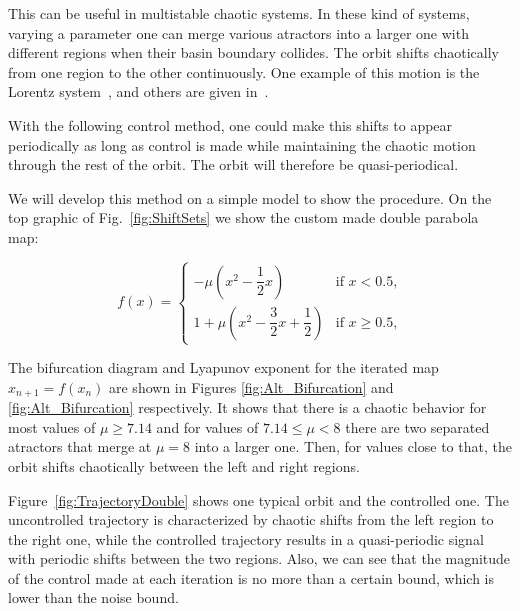 This can be useful in multistable chaotic systems. In these kind of systems, varying a parameter one can merge various atractors into a larger one with different regions when their basin boundary collides. The orbit shifts chaotically from one region to the other continuously. One example of this motion is the Lorentz system~\cite{Lorentz}, and others are given in~\cite{Multistable1,Multistable2, Multistable3, Multistable4}.

With the following control method, one could make this shifts to appear periodically as long as control is made while maintaining the chaotic motion through the rest of the orbit. The orbit will therefore be quasi-periodical.

We will develop this method on a simple model to show the procedure. On the top graphic of Fig.~\ref{fig:ShiftSets} we show the custom made double parabola map:

\begin{equation}
f(x) = \left\{ \begin{array}{ll}
-\mu (x^2 - \dfrac{1}{2}x)  & \mbox{if $x<0.5$,} \\
1 + \mu (x^2 -\dfrac{3}{2}x + \dfrac{1}{2})  & \mbox{if $x\geq 0.5$,} 
\end{array}
\right.
\end{equation}


The bifurcation diagram and Lyapunov exponent for the iterated map $x_{n+1} = f(x_n)$ are shown in Figures \ref{fig:Alt_Bifurcation} and \ref{fig:Alt_Bifurcation} respectively. It shows that there is a chaotic behavior for most values of $\mu \geq 7.14$ and for values of $ 7.14 \leq \mu < 8$ there are two separated atractors that merge at $\mu = 8$ into a larger one. Then, for values close to that, the orbit shifts chaotically between the left and right regions. 

Figure~\ref{fig:TrajectoryDouble} shows one typical orbit and the controlled one. The uncontrolled trajectory is characterized by chaotic shifts from the left region to the right one, while the controlled trajectory results in a quasi-periodic signal with periodic shifts between the two regions. Also, we can see that the magnitude of the control made at each iteration is no more than a certain bound, which is lower than the noise bound.



